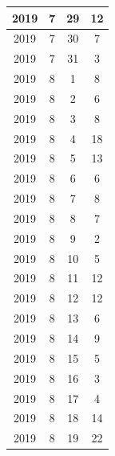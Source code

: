 \begin{longtable} {|c|c|c|c|}
\hline
2019         & 7            & 29           & 12                        \\ 
\hline
2019         & 7            & 30           & 7                         \\ 
\hline
2019         & 7            & 31           & 3                         \\ 
\hline
2019         & 8            & 1            & 8                         \\ 
\hline
2019         & 8            & 2            & 6                         \\ 
\hline
2019         & 8            & 3            & 8                         \\ 
\hline
2019         & 8            & 4            & 18                        \\ 
\hline
2019         & 8            & 5            & 13                        \\ 
\hline
2019         & 8            & 6            & 6                         \\ 
\hline
2019         & 8            & 7            & 8                         \\ 
\hline
2019         & 8            & 8            & 7                         \\ 
\hline
2019         & 8            & 9            & 2                         \\ 
\hline
2019         & 8            & 10           & 5                         \\ 
\hline
2019         & 8            & 11           & 12                        \\ 
\hline
2019         & 8            & 12           & 12                        \\ 
\hline
2019         & 8            & 13           & 6                         \\ 
\hline
2019         & 8            & 14           & 9                         \\ 
\hline
2019         & 8            & 15           & 5                         \\ 
\hline
2019         & 8            & 16           & 3                         \\ 
\hline
2019         & 8            & 17           & 4                         \\ 
\hline
2019         & 8            & 18           & 14                        \\ 
\hline
2019         & 8            & 19           & 22                        \\ 

\end{longtable}
